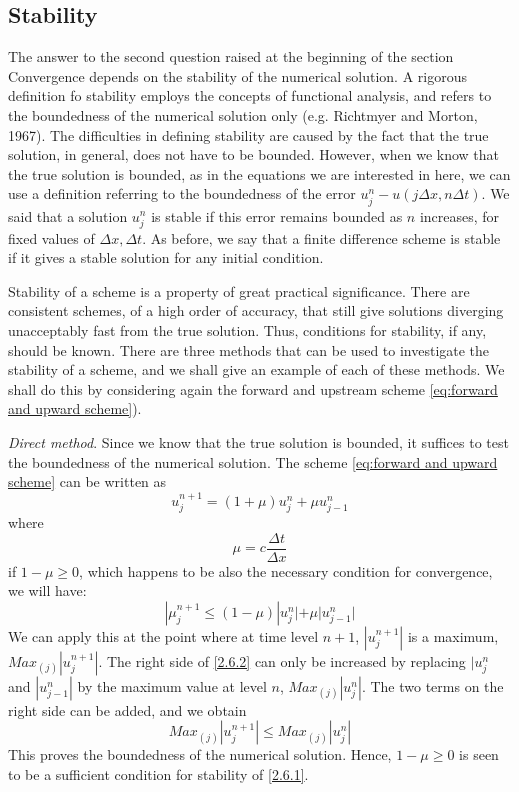 \subsection{Stability}
The answer to the second question raised at the beginning of the section Convergence depends on the stability of the numerical solution. A rigorous definition fo stability employs the concepts of functional analysis, and refers to the boundedness of the numerical solution only (e.g. Richtmyer and Morton, 1967). The difficulties in defining stability are caused by the fact that the true solution, in general, does not have to be bounded. However, when we know that the true solution is bounded, as in the equations we are interested in here, we can use a definition referring to the boundedness of the error $u_j^n-u(j\Delta x, n\Delta t)$. We said that a solution $u_j^n$ is stable if this error remains bounded as $n$ increases, for fixed values of $\Delta x, \Delta t$. As before, we say that a finite difference scheme is stable if it gives a stable solution for any initial condition.

Stability of a scheme is a property of great practical significance. There are consistent schemes, of a high order of accuracy, that still give solutions diverging unacceptably fast from the true solution. Thus, conditions for stability, if any, should be known. There are three methods that can be used to investigate the stability of a scheme, and we shall give an example of each of these methods. We shall do this by considering again the forward and upstream scheme \ref{eq:forward and upward scheme}).

\textit{Direct method}. Since we know that the true solution is bounded, it suffices to test the boundedness of the numerical solution. The scheme \ref{eq:forward and upward scheme} can be written as 
\begin{equation}\label{2.6.1}
    u_j^{n+1}=(1+\mu)u_j^n+\mu u^n_{j-1}    
\end{equation}
where 
$$\mu=c\frac{\Delta t}{\Delta x}$$
if $1-\mu\geq 0$, which happens to be also the necessary condition for convergence, we will have:
\begin{equation}\label{2.6.2}
    |\mu_j^{n+1}\leq(1-\mu)|u_j^n|+\mu|u^n_{j-1}|
\end{equation}
We can apply this at the point where at time level $n+1$, $|u_j^{n+1}|$ is a maximum, $Max_{(j)}|u_j^{n+1}|$. The right side of \ref{2.6.2} can only be increased by replacing $|u_j^n$ and $|u_{j-1}^n|$ by the maximum value at level $n$, $Max_{(j)}|u_j^n|$. The two terms on the right side can be added, and we obtain
$$Max_{(j)}|u_j^{n+1}|\leq Max_{(j)}|u_j^n|$$
This proves the boundedness of the numerical solution. Hence, $1-\mu\geq 0$ is seen to be a sufficient condition for stability of \ref{2.6.1}.

